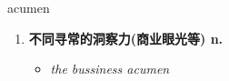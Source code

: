 
\begin{frame}
{\huge acumen}
\begin{center}
\begin{enumerate}\Large
  \item \textbf{不同寻常的洞察力(商业眼光等) n.}
  \begin{itemize}
    \item \em{\Large{the bussiness acumen}}
  \end{itemize}
\end{enumerate}
\end{center}
\end{frame}
